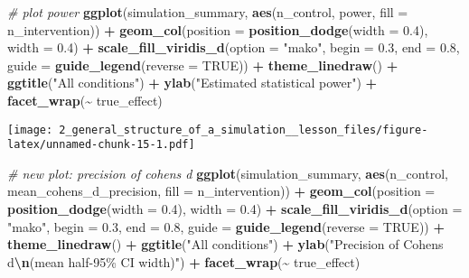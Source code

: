 \documentclass[
]{article}
\newenvironment{Shaded}{\begin{snugshade}}{\end{snugshade}}
\newcommand{\AttributeTok}[1]{\textcolor[rgb]{0.13,0.29,0.53}{#1}}
\newcommand{\CommentTok}[1]{\textcolor[rgb]{0.56,0.35,0.01}{\textit{#1}}}
\newcommand{\ConstantTok}[1]{\textcolor[rgb]{0.56,0.35,0.01}{#1}}
\newcommand{\FloatTok}[1]{\textcolor[rgb]{0.00,0.00,0.81}{#1}}
\newcommand{\FunctionTok}[1]{\textcolor[rgb]{0.13,0.29,0.53}{\textbf{#1}}}
\newcommand{\NormalTok}[1]{#1}
\newcommand{\SpecialCharTok}[1]{\textcolor[rgb]{0.81,0.36,0.00}{\textbf{#1}}}
\newcommand{\StringTok}[1]{\textcolor[rgb]{0.31,0.60,0.02}{#1}}
\begin{document}
\begin{Shaded}
\begin{Highlighting}[]
\CommentTok{\# plot power }
\FunctionTok{ggplot}\NormalTok{(simulation\_summary, }\FunctionTok{aes}\NormalTok{(n\_control, power, }\AttributeTok{fill =}\NormalTok{ n\_intervention)) }\SpecialCharTok{+}
  \FunctionTok{geom\_col}\NormalTok{(}\AttributeTok{position =} \FunctionTok{position\_dodge}\NormalTok{(}\AttributeTok{width =} \FloatTok{0.4}\NormalTok{), }\AttributeTok{width =} \FloatTok{0.4}\NormalTok{) }\SpecialCharTok{+}
  \FunctionTok{scale\_fill\_viridis\_d}\NormalTok{(}\AttributeTok{option =} \StringTok{"mako"}\NormalTok{, }\AttributeTok{begin =} \FloatTok{0.3}\NormalTok{, }\AttributeTok{end =} \FloatTok{0.8}\NormalTok{, }
                       \AttributeTok{guide =} \FunctionTok{guide\_legend}\NormalTok{(}\AttributeTok{reverse =} \ConstantTok{TRUE}\NormalTok{)) }\SpecialCharTok{+}
  \FunctionTok{theme\_linedraw}\NormalTok{() }\SpecialCharTok{+}
  \FunctionTok{ggtitle}\NormalTok{(}\StringTok{"All conditions"}\NormalTok{) }\SpecialCharTok{+}
  \FunctionTok{ylab}\NormalTok{(}\StringTok{"Estimated statistical power"}\NormalTok{) }\SpecialCharTok{+}
  \FunctionTok{facet\_wrap}\NormalTok{(}\SpecialCharTok{\textasciitilde{}}\NormalTok{ true\_effect)}
\end{Highlighting}
\end{Shaded}

\texttt{[image: 2\_general\_structure\_of\_a\_simulation\_\_lesson\_files/figure-latex/unnamed-chunk-15-1.pdf]}

\begin{Shaded}
\begin{Highlighting}[]
\CommentTok{\# new plot: precision of cohen\textquotesingle{}s d}
\FunctionTok{ggplot}\NormalTok{(simulation\_summary, }\FunctionTok{aes}\NormalTok{(n\_control, mean\_cohens\_d\_precision, }\AttributeTok{fill =}\NormalTok{ n\_intervention)) }\SpecialCharTok{+}
  \FunctionTok{geom\_col}\NormalTok{(}\AttributeTok{position =} \FunctionTok{position\_dodge}\NormalTok{(}\AttributeTok{width =} \FloatTok{0.4}\NormalTok{), }\AttributeTok{width =} \FloatTok{0.4}\NormalTok{) }\SpecialCharTok{+}
  \FunctionTok{scale\_fill\_viridis\_d}\NormalTok{(}\AttributeTok{option =} \StringTok{"mako"}\NormalTok{, }\AttributeTok{begin =} \FloatTok{0.3}\NormalTok{, }\AttributeTok{end =} \FloatTok{0.8}\NormalTok{, }
                       \AttributeTok{guide =} \FunctionTok{guide\_legend}\NormalTok{(}\AttributeTok{reverse =} \ConstantTok{TRUE}\NormalTok{)) }\SpecialCharTok{+}
  \FunctionTok{theme\_linedraw}\NormalTok{() }\SpecialCharTok{+}
  \FunctionTok{ggtitle}\NormalTok{(}\StringTok{"All conditions"}\NormalTok{) }\SpecialCharTok{+}
  \FunctionTok{ylab}\NormalTok{(}\StringTok{"Precision of Cohen\textquotesingle{}s d}\SpecialCharTok{\textbackslash{}n}\StringTok{(mean half{-}95\% CI width)"}\NormalTok{) }\SpecialCharTok{+}
  \FunctionTok{facet\_wrap}\NormalTok{(}\SpecialCharTok{\textasciitilde{}}\NormalTok{ true\_effect)}
\end{Highlighting}
\end{Shaded}
\end{document}
